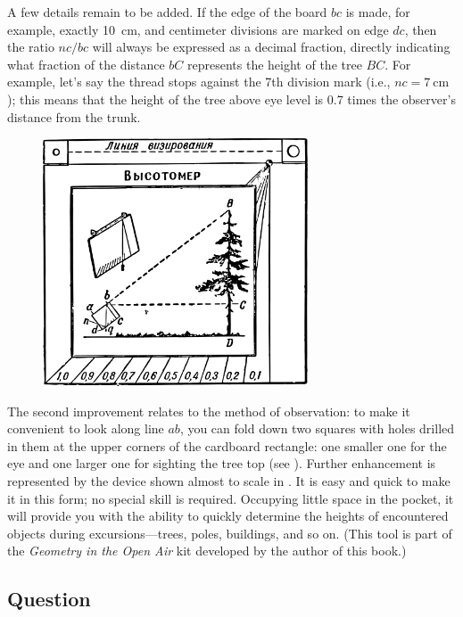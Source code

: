 A few details remain to be added. If the edge of the board $bc$ is made, for example, exactly \SI{10}{\centi\meter}, and centimeter divisions are marked on edge $dc$, then the ratio $nc/bc$ will always be expressed as a decimal fraction, directly indicating what fraction of the distance $bC$ represents the height of the tree $BC$. For example, let's say the thread stops against the 7th division mark (i.e., $nc = \SI{7}{\centi\meter}$); this means that the height of the tree above eye level is 0.7 times the observer's distance from the trunk.

\begin{figure}[h!]
\centering
\includegraphics[width=0.7\textwidth]{figures/ch-01/fig-01-12.pdf}
\end{figure}

The second improvement relates to the method of observation: to make it convenient to look along line $ab$, you can fold down two squares with holes drilled in them at the upper corners of the cardboard rectangle: one smaller one for the eye and one larger one for sighting the tree top (see ). Further enhancement is represented by the device shown almost to scale in . It is easy and quick to make it in this form; no special skill is required. Occupying little space in the pocket, it will provide you with the ability to quickly determine the heights of encountered objects during excursions—trees, poles, buildings, and so on. (This tool is part of the \emph{Geometry in the Open Air} kit developed by the author of this book.)

\subsection*{Question}

